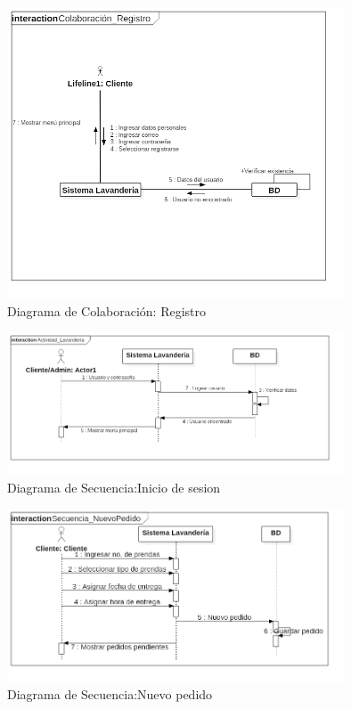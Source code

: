 \begin{figure}[htb]
\begin{center}
\includegraphics[width=10cm]{./imagenes/diagramas/Colaboracion_Registro.png}
\end{center}
\caption{Diagrama de Colaboración: Registro}
\end{figure}





\begin{figure}[htb]
\begin{center}
\includegraphics[width=10cm]{./imagenes/diagramas/Secuencia_InicioSesion.png}
\end{center}
\caption{Diagrama de Secuencia:Inicio de sesion}
\end{figure}


\begin{figure}[htb]
\begin{center}
\includegraphics[width=10cm]{./imagenes/diagramas/Secuencia_NuevoPedido.png}
\end{center}
\caption{Diagrama de Secuencia:Nuevo pedido}
\end{figure}


